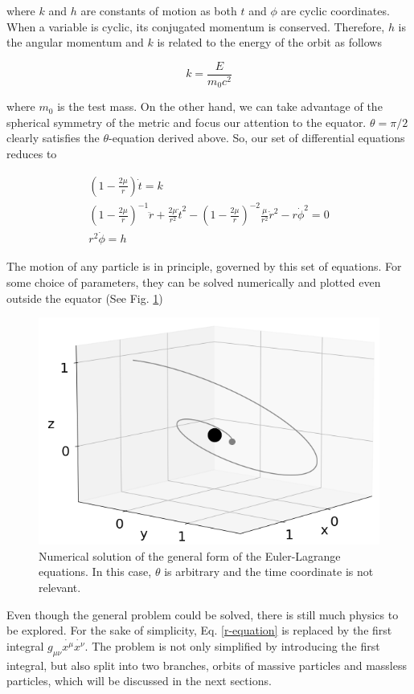 \documentclass[letterpaper,11pt,onecolumn]{article}
\begin{document}
where $k$ and $h$ are constants of motion as both $t$ and $\phi$ are cyclic coordinates. When a variable is cyclic, its conjugated momentum is conserved. Therefore, $h$ is the angular momentum and  $k$ is related to the energy of the orbit as follows

\begin{equation}
    k = \frac{E}{m_0 c^2}
\end{equation}

where $m_0$ is the test mass. On the other hand, we can take advantage of the spherical symmetry of the metric and focus our attention to the equator. $\theta = \pi / 2$ clearly satisfies the $\theta$-equation derived above. So, our set of differential equations reduces to 

    \begin{eqnarray}
        \left( 1 - \frac{2 \mu}{r} \right) \dot{t} = k \label{t-equation} \\
        \left( 1 - \frac{2 \mu}{r} \right)^{-1} \ddot{r} + \frac{2\mu}{r^2} \dot{t}^2 - \left( 1 - \frac{2 \mu}{r} \right)^{-2} \frac{\mu}{r^2} \dot{r}^2 - r\dot{\phi}^2  = 0 \label{r-equation} \\
        r^2 \dot{\phi} = h \label{phi-equation}
    \end{eqnarray}

The motion of any particle is in principle, governed by this set of equations. For some choice of parameters, they can be solved numerically and plotted even outside the equator (See Fig. \ref{fig:general_orbit})

\begin{figure}[h!]
    \centering
    \includegraphics[width=0.6\linewidth]{Presentations/Images/2_gen_obit1.png}
    \caption{Numerical solution of the general form of the Euler-Lagrange equations. In this case, $\theta$ is arbitrary and the time coordinate is not relevant.}
    \label{fig:general_orbit}
\end{figure}

Even though the general problem could be solved, there is still much physics to be explored. For the sake of simplicity, Eq. \ref{r-equation} is replaced by the first integral $g_{\mu \nu} \dot{x^\mu} \dot{x^\nu}$. The problem is not only simplified by introducing the first integral, but also split into two branches, orbits of massive particles and massless particles, which will be discussed in the next sections.
\end{document}
